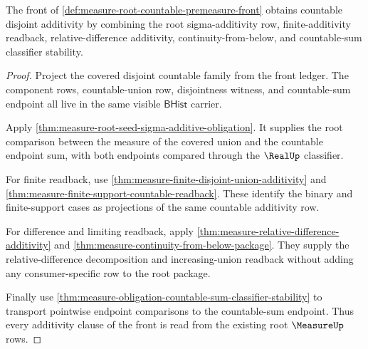 \begin{theorem}
\label{thm:measure-root-countable-premeasure-additivity-obligation}
The front of \autoref{def:measure-root-countable-premeasure-front} obtains
countable disjoint additivity by combining the root sigma-additivity row,
finite-additivity readback, relative-difference additivity,
continuity-from-below, and countable-sum classifier stability.
\end{theorem}
\begin{proof}
Project the covered disjoint countable family from the front ledger. The
component rows, countable-union row, disjointness witness, and countable-sum
endpoint all live in the same visible $\mathsf{BHist}$ carrier.

Apply \autoref{thm:measure-root-seed-sigma-additive-obligation}. It supplies
the root comparison between the measure of the covered union and the
countable endpoint sum, with both endpoints compared through the $\RealUp$
classifier.

For finite readback, use
\autoref{thm:measure-finite-disjoint-union-additivity} and
\autoref{thm:measure-finite-support-countable-readback}. These identify the
binary and finite-support cases as projections of the same countable
additivity row.

For difference and limiting readback, apply
\autoref{thm:measure-relative-difference-additivity} and
\autoref{thm:measure-continuity-from-below-package}. They supply the
relative-difference decomposition and increasing-union readback without
adding any consumer-specific row to the root package.

Finally use \autoref{thm:measure-obligation-countable-sum-classifier-stability}
to transport pointwise endpoint comparisons to the countable-sum endpoint.
Thus every additivity clause of the front is read from the existing root
$\MeasureUp$ rows.
\end{proof}

